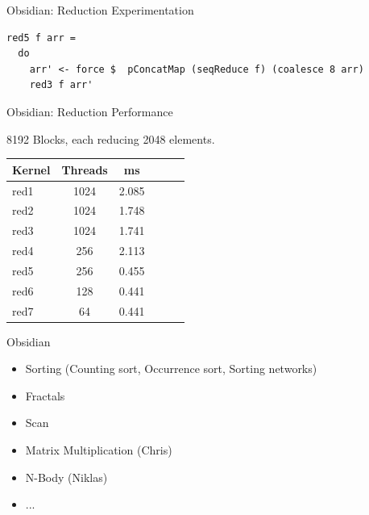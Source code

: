 \documentclass[xcolor=dvipsnames]{beamer}
\begin{document}
\begin{frame}[fragile]{Obsidian: Reduction Experimentation}

  \begin{block}{} 
    
\Fontvi
\begin{verbatim}
red5 f arr =
  do
    arr' <- force $  pConcatMap (seqReduce f) (coalesce 8 arr)
    red3 f arr' 
\end{verbatim} 
    
  \end{block}

\end{frame} 

\begin{frame}{Obsidian: Reduction Performance} 

8192 Blocks, each reducing 2048 elements. 

\begin{center}
\begin{tabular}{| l | c | c | c | c | r | }
\hline 
  Kernel & Threads & ms \\ \hline 
  red1 & 1024 & 2.085 \\ \hline
  red2 & 1024 & 1.748 \\ \hline
  red3 & 1024 & 1.741 \\ \hline
  red4 & 256 &  2.113  \\ \hline
  red5 & 256 &  0.455  \\ \hline
  red6 & 128 &  0.441  \\ \hline
  red7 & 64 &  0.441  \\ \hline
\end{tabular}
\end{center}
\end{frame} 

\begin{frame}{Obsidian} 

\begin{itemize} 
  \item Sorting (Counting sort, Occurrence sort, Sorting networks) 
  \item Fractals
  \item Scan 
  \item Matrix Multiplication (Chris)
  \item N-Body (Niklas) 
  \item ... 
\end{itemize} 


\end{frame} 
\end{document}
